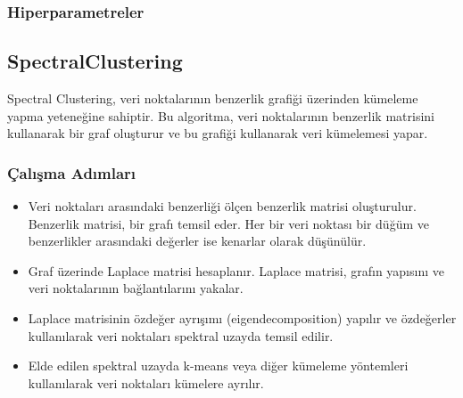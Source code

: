 \subsubsection{Hiperparametreler}
\begin{table}[h]
\centering
{\scriptsize\renewcommand{\arraystretch}{0.4}
{}}
\end{table}

\subsection{SpectralClustering}
Spectral Clustering, veri noktalarının benzerlik grafiği üzerinden kümeleme yapma yeteneğine sahiptir. Bu algoritma, veri noktalarının benzerlik matrisini kullanarak bir graf oluşturur ve bu grafiği kullanarak veri kümelemesi yapar.

\subsubsection{Çalışma Adımları}
\begin{itemize}
    \item Veri noktaları arasındaki benzerliği ölçen benzerlik matrisi oluşturulur. Benzerlik matrisi, bir grafı temsil eder. Her bir veri noktası bir düğüm ve benzerlikler arasındaki değerler ise kenarlar olarak düşünülür.
    \item Graf üzerinde Laplace matrisi hesaplanır. Laplace matrisi, grafın yapısını ve veri noktalarının bağlantılarını yakalar.
    \item Laplace matrisinin özdeğer ayrışımı (eigendecomposition) yapılır ve özdeğerler kullanılarak veri noktaları spektral uzayda temsil edilir.
    \item Elde edilen spektral uzayda k-means veya diğer kümeleme yöntemleri kullanılarak veri noktaları kümelere ayrılır.
\end{itemize}

